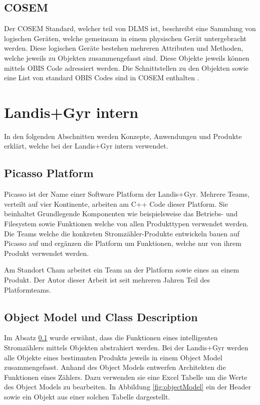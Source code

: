 \subsection{COSEM}\label{cosem}
Der \ac{COSEM} Standard, welcher teil von \ac{DLMS} ist, beschreibt eine Sammlung von logischen Geräten, welche gemeinsam in einem physischen Gerät untergebracht werden.
Diese logischen Geräte bestehen mehreren Attributen und Methoden, welche jeweils zu Objekten zusammengefasst sind.
Diese Objekte jeweils können mittels \ac{OBIS} Code adressiert werden.
Die Schnittstellen zu den Objekten sowie eine List von standard \ac{OBIS} Codes sind in \ac{COSEM} enthalten  \parencite{vyas2012advance}.


\section{Landis+Gyr intern}\label{lgintern}
In den folgenden Abschnitten werden Konzepte, Anwendungen und Produkte erklärt, welche bei der Landis+Gyr intern verwendet.

\subsection{Picasso Platform}\label{picasso}
Picasso ist der Name einer Software Platform der Landis+Gyr.
Mehrere Teams, verteilt auf vier Kontinente, arbeiten am C++ Code dieser Platform.
Sie beinhaltet Grundlegende Komponenten wie beispielsweise das Betriebs- und Filesystem sowie Funktionen welche von allen Produkttypen verwendet werden.
Die Teams welche die konkreten Stromzähler-Produkte entwickeln bauen auf Picasso auf und ergänzen die Platform um Funktionen, welche nur von ihrem Produkt verwendet werden.

Am Standort Cham arbeitet ein Team an der Platform sowie eines an einem Produkt.
Der Autor dieser Arbeit ist seit mehreren Jahren Teil des Platformteams.



\subsection{Object Model und Class Description}\label{objectModelsClassDescriptions}
Im Absatz \ref{cosem} wurde erwähnt, dass die Funktionen eines intelligenten Stromzählers mittels Objekten abstrahiert werden.
Bei der Landis+Gyr werden alle Objekte eines bestimmten Produkts jeweils in einem Object Model zusammengefasst.
Anhand des Object Models entwerfen Architekten die Funktionen eines Zählers.
Dazu verwenden sie eine Excel Tabelle um die Werte des Object Models zu bearbeiten.
In Abbildung \ref{fig:objectModel} ein der Header sowie ein Objekt aus einer solchen Tabelle dargestellt.

